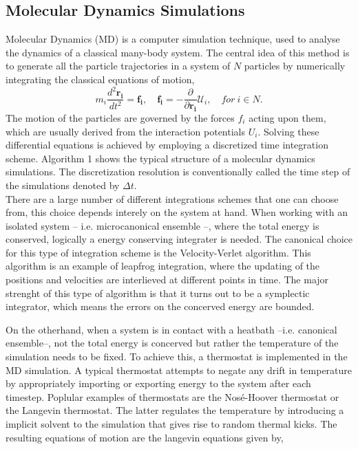 \subsection{Molecular Dynamics Simulations}
Molecular Dynamics (MD) is a computer simulation technique, used to analyse
the dynamics of a classical many-body system. The central idea of this method is to
generate all the particle trajectories in a system of $N$ particles by numerically
integrating the classical equations of motion,
\[
m_i \frac{d^2 \boldsymbol{r_i}}{dt^2} = \boldsymbol{f_i}, \quad \boldsymbol{f_i} = -
    \frac{\partial}{\partial \boldsymbol{r_i}} \mathcal{U}_i, \quad for\ i \in N.
\]
The motion of the particles are governed by the forces $f_i$ acting upon them, which are
usually derived from the interaction potentials $U_i$.
Solving these differential equations is achieved by employing a discretized time
integration scheme.  Algorithm 1 shows the typical structure of a molecular dynamics
simulations. The discretization resolution is conventionally called the time step of the
simulations denoted by $\Delta t$.\\

\noindent There are a large number of different integrations schemes that one can choose
from, this
choice depends interely on the system at hand.
When working with an isolated system -- i.e. microcanonical ensemble --, where the total
energy is conserved, logically a energy conserving integrater is needed. The canonical
choice for this type of integration scheme is the Velocity-Verlet algorithm. This
algorithm is an example of leapfrog integration, where the updating of the positions
and velocities are interlieved at different points in time. The major strenght of this
type of algorithm is that it turns out to be a symplectic integrator, which means the
errors on the concerved energy are bounded.

On the otherhand, when a system is in contact with a heatbath --i.e. canonical
ensemble--, not the total energy is concerved but rather the temperature of the
simulation needs to be fixed. To achieve this, a thermostat is implemented in the MD
simulation. A typical thermostat attempts to negate any drift in temperature by
appropriately importing or exporting energy to the system after each timestep.
Poplular examples of thermostats are the Nos\'e-Hoover thermostat or the Langevin
thermostat.  The latter regulates the temperature by introducing a implicit solvent to
the simulation that gives rise to random thermal kicks. The resulting equations of motion
are the langevin equations given by,

